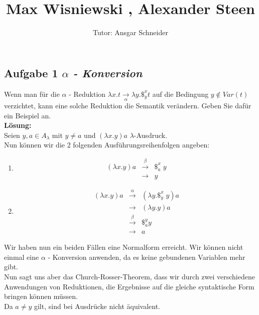 \documentclass[11pt,a4paper,ngerman]{article}
\author{Tutor: Ansgar Schneider}
\date{}
\title{Max Wisniewski , Alexander Steen}
\begin{document}
   
\maketitle
\thispagestyle{fancy}
\newcommand{\A}{\mathbb{A}}

\subsection*{Aufgabe 1 \mdseries\itshape $\alpha$ - Konversion}
Wenn man für die $\alpha$ - Reduktion $\lambda x.t \underset{\alpha}{\rightarrow} \lambda y. \$_y^x t $ auf
die Bedingung $y \not\in Var(t)$ verzichtet, kann eine solche Reduktion die Semantik verändern. Geben Sie
dafür ein Beispiel an.\\

\textbf{Lösung:}\\
   Seien $y,a \in A_\lambda$ mit $y \not= a$ und $(\lambda x.y)a$ $\lambda$-Ausdruck.\\
   Nun können wir die 2 folgenden Ausführungsreihenfolgen angeben:
   \begin{enumerate}[1:]
      \item $$\begin{array}{rcl}
         (\lambda x.y)a & \overset{\beta}{\longrightarrow}& \$_a^x \; y\\
            &\longrightarrow& y
         \end{array}$$
      \item $$\begin{array}{rcl}
            (\lambda x.y)a &\overset{\alpha}{\longrightarrow}& (\lambda y.\$_y^x \; y)a\\
               &\longrightarrow& (\lambda y.y)a\\
               &\overset{\beta}{\longrightarrow}& \$_a^y y\\
               &\longrightarrow& a
         \end{array}$$ 
   \end{enumerate}
   Wir haben nun ein beiden Fällen eine Normalform erreicht. Wir können nicht einmal eine
   $\alpha$ - Konversion anwenden, da es keine gebundenen Variablen mehr gibt.\\
   Nun sagt uns aber das Church-Rosser-Theorem, dass wir durch zwei verschiedene Anwendungen von
   Reduktionen, die Ergebnisse auf die gleiche syntaktische Form bringen können müssen.\\
   Da $a \not= y$ gilt, sind bei Ausdrücke nicht äquivalent.
   
\end{document}
